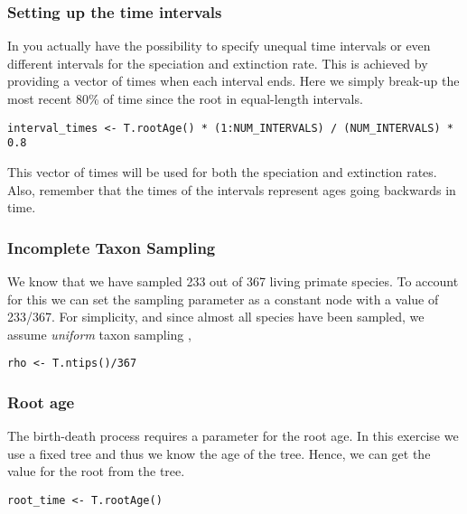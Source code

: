 \subsubsection{Setting up the time intervals}
In \RevBayes you actually have the possibility to specify unequal time intervals or even different intervals for the speciation and extinction rate.
This is achieved by providing a vector of times when each interval ends.
Here we simply break-up the most recent 80\% of time since the root in equal-length intervals.
{\tt \begin{snugshade*}
\begin{lstlisting}
interval_times <- T.rootAge() * (1:NUM_INTERVALS) / (NUM_INTERVALS) * 0.8
\end{lstlisting}
\end{snugshade*}}
This vector of times will be used for both the speciation and extinction rates.
Also, remember that the times of the intervals represent ages going backwards in time.

\subsubsection{Incomplete Taxon Sampling}

We know that we have sampled 233 out of 367 living primate species.
To account for this we can set the sampling parameter as a constant node with a value of 233/367.
For simplicity, and since almost all species have been sampled, we assume \emph{uniform} taxon sampling \citep{Hoehna2011,Hoehna2014a},
{\tt \begin{snugshade*}
\begin{lstlisting}
rho <- T.ntips()/367
\end{lstlisting}
\end{snugshade*}}


\subsubsection{Root age}

The birth-death process requires a parameter for the root age.
In this exercise we use a fixed tree and thus we know the age of the tree.
Hence, we can get the value for the root from the \citet{MagnusonFord2012} tree.
{\tt \begin{snugshade*}
\begin{lstlisting}
root_time <- T.rootAge()
\end{lstlisting}
\end{snugshade*}}

